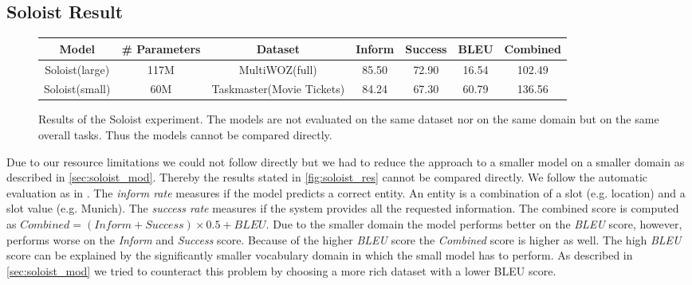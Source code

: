 \documentclass[twocolumn]{tum-article}
\begin{document}
\subsection{Soloist Result}
\begin{figure}[!h]
\centering
\begin{tabular}{c|c|c|c|c|c|c}
\hline
\textbf{Model} & \textbf{\# Parameters} & \textbf{Dataset} & \textbf{Inform} & \textbf{Success} & \textbf{BLEU} & \textbf{Combined}\\
\hline
Soloist(large) & 117M & MultiWOZ(full) & 85.50 & 72.90 & 16.54 & 102.49 \\
\hline
Soloist(small) & 60M & Taskmaster(Movie Tickets) & 84.24 & 67.30 & 60.79 & 136.56\\
\hline
\end{tabular}
\caption{Results of the Soloist experiment. The models are not evaluated on the same dataset nor on the same domain but on the same overall tasks. Thus the models cannot be compared directly. }
\label{fig:soloist_res}
\end{figure}
Due to our resource limitations we could not follow \cite{peng2020soloist} directly but we had to reduce the approach to a smaller model on a smaller domain as described in \autoref{sec:soloist_mod}. Thereby the results stated in \autoref{fig:soloist_res} cannot be compared directly. 
We follow the automatic evaluation as in \cite{peng2020soloist, budzianowski2020multiwoz}. The \textit{inform rate} measures if the model predicts a correct entity. An entity is a combination of a slot (e.g. location) and a slot value (e.g. Munich). The \textit{success rate} measures if the system provides all the requested information. The combined score is computed as $Combined = (Inform + Success) \times 0.5 + BLEU$.
Due to the smaller domain the model performs better on the \textit{BLEU} score, however, performs worse on the \textit{Inform} and \textit{Success} score. Because of the higher \textit{BLEU} score the \textit{Combined} score is higher as well. 
The high \textit{BLEU} score can be explained by the significantly smaller vocabulary domain in which the small model has to perform. As described in \autoref{sec:soloist_mod} we tried to counteract this problem by choosing a more rich dataset with a lower BLEU score.  
\end{document}
